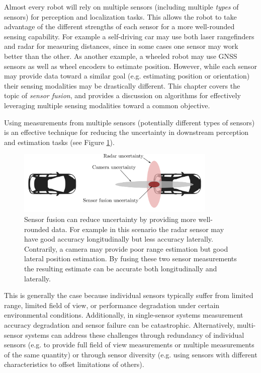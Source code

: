 Almost every robot will rely on multiple sensors (including multiple \textit{types} of sensors) for perception and localization tasks. This allows the robot to take advantage of the different strengths of each sensor for a more well-rounded sensing capability. For example a self-driving car may use both laser rangefinders and radar for measuring distances, since in some cases one sensor may work better than the other. As another example, a wheeled robot may use GNSS sensors as well as wheel encoders to estimate position.
However, while each sensor may provide data toward a similar goal (e.g. estimating position or orientation) their sensing modalities may be drastically different. This chapter covers the topic of \textit{sensor fusion}\cite{Gustafsson2010}\cite{Simon2006}, and provides a discussion on algorithms for effectively leveraging multiple sensing modalities toward a common objective.

Using measurements from multiple sensors (potentially different types of sensors) is an effective technique for reducing the uncertainty in downstream perception and estimation tasks (see Figure \ref{fig:reduceuncertainty}).
\begin{figure}[ht]
    \centering
    \includegraphics[width=0.85\textwidth]{tex/figs/ch19_figs/carsensors.png}
    \caption{Sensor fusion can reduce uncertainty by providing more well-rounded data. For example in this scenario the radar sensor may have good accuracy longitudinally but less accuracy laterally. Contrarily, a camera may provide poor range estimation but good lateral position estimation. By fusing these two sensor measurements the resulting estimate can be accurate both longitudinally and laterally.}
    \label{fig:reduceuncertainty}
\end{figure}
This is generally the case because individual sensors typically suffer from limited range, limited field of view, or performance degradation under certain environmental conditions. Additionally, in single-sensor systems measurement accuracy degradation and sensor failure can be catastrophic. Alternatively, multi-sensor systems can address these challenges through redundancy of individual sensors (e.g. to provide full field of view measurements or multiple measurements of the same quantity) or through sensor diversity (e.g. using sensors with different characteristics to offset limitations of others).


